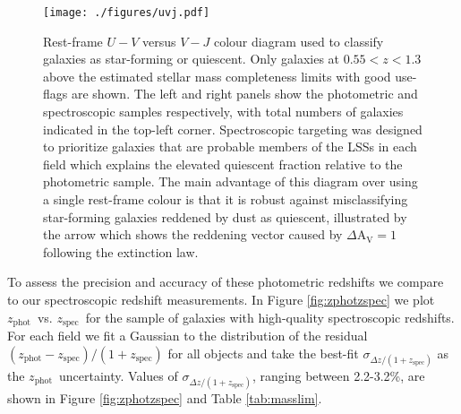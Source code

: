 \documentclass[a4paper,fleqn,usenatbib]{mnras}
\def\zphot{$z_{\mathrm{phot}}$}
\def\zspec{$z_{\mathrm{spec}}$}
\begin{document}
\begin{figure*}
	\texttt{[image: ./figures/uvj.pdf]}
	\caption{
	Rest-frame $U-V$ versus $V-J$ colour diagram used to classify galaxies as star-forming or quiescent.
	Only galaxies at $0.55 < z < 1.3$ above the estimated stellar mass completeness limits with good use-flags are shown.
	The left and right panels show the photometric and spectroscopic samples respectively, with total numbers of galaxies indicated in the top-left corner.
	Spectroscopic targeting was designed to prioritize galaxies that are probable members of the LSSs in each field \citep[see][]{Lubin2009} which explains the elevated quiescent fraction relative to the photometric sample.
	The main advantage of this diagram over using a single rest-frame colour is that it is robust against  misclassifying star-forming galaxies reddened by dust as quiescent, illustrated by the arrow which shows the reddening vector caused by $\Delta \mathrm{A_V} = 1$ following the \citet{Calzetti2000} extinction law.
	}
	\label{fig:uvj}
\end{figure*}


To assess the precision and accuracy of these photometric redshifts we compare to our spectroscopic redshift measurements.
In Figure \ref{fig:zphotzspec} we plot \zphot\ vs. \zspec\ for the sample of galaxies with high-quality spectroscopic redshifts.
For each field we fit a Gaussian to the distribution of the residual $(z_{\mathrm{phot}} - z_{\mathrm{spec}}) / (1 + z_{\mathrm{spec}})$ for all objects and take the best-fit $\sigma_{\Delta z / (1 + z_{\mathrm{spec}})}$ as the \zphot\ uncertainty.
Values of $\sigma_{\Delta z / (1 + z_{\mathrm{spec}})}$, ranging between 2.2-3.2\%, are shown in Figure \ref{fig:zphotzspec} and Table \ref{tab:masslim}.
\end{document}
